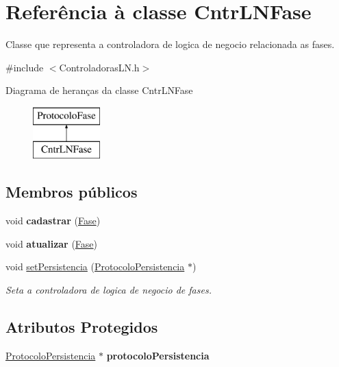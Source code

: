 \hypertarget{class_cntr_l_n_fase}{
\section{\-Referência à classe \-Cntr\-L\-N\-Fase}
\label{class_cntr_l_n_fase}
}


\-Classe que representa a controladora de logica de negocio relacionada as fases.  




{\ttfamily \#include $<$\-Controladoras\-L\-N.\-h$>$}

\-Diagrama de heranças da classe \-Cntr\-L\-N\-Fase\begin{figure}[H]
\begin{center}
\leavevmode
\includegraphics[height=2.000000cm]{class_cntr_l_n_fase}
\end{center}
\end{figure}
\subsection*{\-Membros públicos}
\begin{DoxyCompactItemize}
\item 
\hypertarget{class_cntr_l_n_fase_a692f404cc038c33e90a90afd46f32ed1}{
void {\bfseries cadastrar} (\hyperlink{class_fase}{\-Fase})}
\label{class_cntr_l_n_fase_a692f404cc038c33e90a90afd46f32ed1}

\item 
\hypertarget{class_cntr_l_n_fase_a5ac54cd1ac36a06f92fe3e541f0f4cd2}{
void {\bfseries atualizar} (\hyperlink{class_fase}{\-Fase})}
\label{class_cntr_l_n_fase_a5ac54cd1ac36a06f92fe3e541f0f4cd2}

\item 
void \hyperlink{class_cntr_l_n_fase_a94570fc19d3909e7b776dbfe97ece81e}{set\-Persistencia} (\hyperlink{class_protocolo_persistencia}{\-Protocolo\-Persistencia} $\ast$)
\begin{DoxyCompactList}\small\item\em \-Seta a controladora de logica de negocio de fases. \end{DoxyCompactList}\end{DoxyCompactItemize}
\subsection*{\-Atributos \-Protegidos}
\begin{DoxyCompactItemize}
\item 
\hypertarget{class_cntr_l_n_fase_aa2fca8e42201c6ffcea403a2bfcd2915}{
\hyperlink{class_protocolo_persistencia}{\-Protocolo\-Persistencia} $\ast$ {\bfseries protocolo\-Persistencia}}
\label{class_cntr_l_n_fase_aa2fca8e42201c6ffcea403a2bfcd2915}

\end{DoxyCompactItemize}


